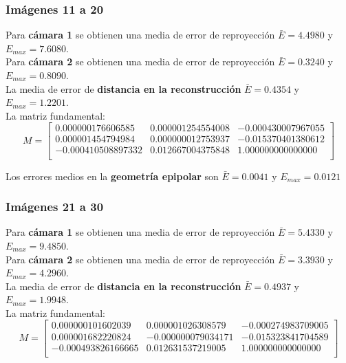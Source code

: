 \documentclass[a4paper, fontsize=11pt]{scrartcl} %
\numberwithin{equation}{section} %
\numberwithin{figure}{section} %
\numberwithin{table}{section} %
\begin{document}
	\subsubsection*{Imágenes 11 a 20}
	
	Para \textbf{cámara 1} se obtienen una media de error de reproyección $\bar{E} = 4.4980$ y $E_{max} = 7.6080$.\\
	Para \textbf{cámara 2} se obtienen una media de error de reproyección $\bar{E} = 0.3240$ y $E_{max} = 0.8090$.\\
	
	La media de error de \textbf{distancia en la reconstrucción} $\bar{E} = 0.4354$ y $E_{max} = 1.2201$.\\
	La matriz fundamental:
	\[
	M=
	\begin{bmatrix}
	0.000000176606585&	0.000001254554008&	-0.000430007967055 \\
	0.000001454794984&	0.000000012753937&	-0.015370401380612 \\
	-0.000410508897332&	0.012667004375848&	1.000000000000000 \\
	
	\end{bmatrix}
	\]
	
	Los errores medios en la \textbf{geometría epipolar} son $\bar{E} = 0.0041$ y $E_{max} = 0.0121$
	
	\subsubsection*{Imágenes 21 a 30}
	
	Para \textbf{cámara 1} se obtienen una media de error de reproyección $\bar{E} = 5.4330$ y $E_{max} = 9.4850$.\\
	Para \textbf{cámara 2} se obtienen una media de error de reproyección $\bar{E} = 3.3930$ y $E_{max} = 4.2960$.\\
	
	La media de error de \textbf{distancia en la reconstrucción} $\bar{E} = 0.4937$ y $E_{max} = 1.9948$.\\
	La matriz fundamental:
	\[
	M=
	\begin{bmatrix}
	0.000000101602039&	0.000001026308579&	-0.000274983709005 \\
	0.000001682220824&	-0.000000079034171&	-0.015323841704589 \\
	-0.000493826166665&	0.012631537219005&	1.000000000000000 \\
	
	\end{bmatrix}
	\]
	
\end{document}
